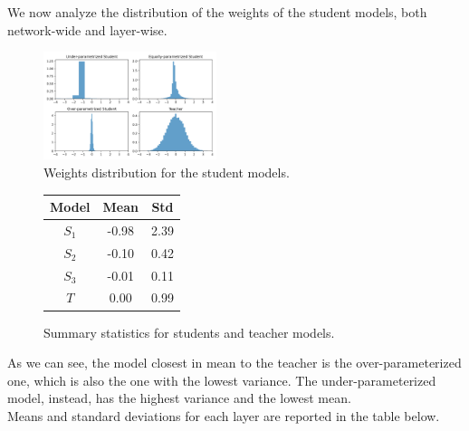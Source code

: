 We now analyze the distribution of the weights of the student models,
both network-wide and layer-wise.

\begin{figure}[H]
    \centering
    \includegraphics[width=0.45\textwidth]{figures/weights_distribution.png}
    \caption{Weights distribution for the student models.}
\end{figure}
\begin{figure}[H]
    \centering
    \begin{tabular}{c|cc}
    \toprule
    \textbf{Model}                      & Mean & Std \\
    \midrule
    $S_1$                                 & -0.98         & 2.39         \\
    $S_2$                                 & -0.10         & 0.42         \\
    $S_3$                                 & -0.01         & 0.11         \\
    $T$                                   &  0.00         & 0.99         \\
    \bottomrule
    \end{tabular}
    \caption{Summary statistics for students and teacher models.}
\end{figure}

As we can see, the model closest in mean to the teacher is the over-parameterized
one, which is also the one with the lowest variance. The under-parameterized model, 
instead, has the highest variance and the lowest mean. \\
Means and standard deviations for each layer are reported in
the table below.

